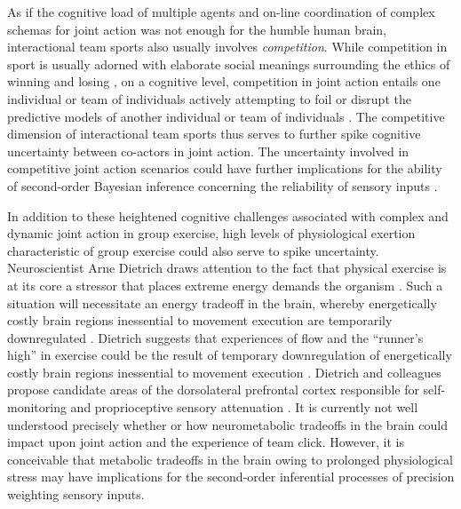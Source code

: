 \begin{CJK}{UTF8}{gbsn}
    As if the cognitive load of multiple agents and on-line coordination of complex schemas for joint action was not enough for the humble human brain, interactional team sports also usually involves \textit{competition}.  While competition in sport is usually adorned with elaborate social meanings surrounding the ethics of winning and losing \citep{McNamee2008}, on a cognitive level, competition in joint action entails one individual or team of individuals actively attempting to foil or disrupt the predictive models of another individual or team of individuals \citep{Reimer2006}.  The competitive dimension of interactional team sports thus serves to further spike cognitive uncertainty between co-actors in joint action.  The uncertainty involved in competitive joint action scenarios could have further implications for the ability of second-order Bayesian inference concerning the reliability of sensory inputs \citep{Pezzulo2014}.

    In addition to these heightened cognitive challenges associated with complex and dynamic joint action in group exercise, high levels of physiological exertion characteristic of group exercise could also serve to spike uncertainty.  Neuroscientist Arne Dietrich draws attention to the fact that physical exercise is at its core a stressor that places extreme energy demands the organism \citep{Dietrich2011}.
    Such a situation will necessitate an energy tradeoff in the brain, whereby energetically costly brain regions inessential to movement execution are temporarily downregulated \citep{Dietrich2004b}.  Dietrich suggests that experiences of flow and the ``runner's high'' in exercise could be the result of temporary downregulation of energetically costly brain regions inessential to movement execution  \citep{Dietrich2004b}.  Dietrich and colleagues propose candidate areas of the dorsolateral prefrontal cortex responsible for self-monitoring and proprioceptive sensory attenuation \citep[commonly known as the ``inner critic'' regions of the brain, see][]{Limb2008}.  It is currently not well understood precisely whether or how neurometabolic tradeoffs in the brain could impact upon joint action and the experience of team click.  However, it is conceivable that metabolic tradeoffs in the brain owing to prolonged physiological stress may have implications for the second-order inferential processes of precision weighting sensory inputs.



\end{CJK}
